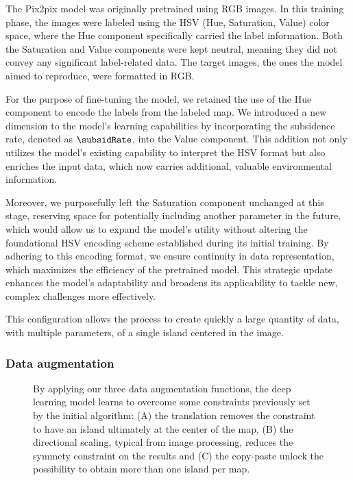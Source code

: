 The Pix2pix model was originally pretrained using RGB images. In this training phase, the images were labeled using the HSV (Hue, Saturation, Value) color space, where the Hue component specifically carried the label information. Both the Saturation and Value components were kept neutral, meaning they did not convey any significant label-related data. The target images, the ones the model aimed to reproduce, were formatted in RGB.

For the purpose of fine-tuning the model, we retained the use of the Hue component to encode the labels from the labeled map. We introduced a new dimension to the model's learning capabilities by incorporating the subsidence rate, denoted as $\subsidRate$, into the Value component. This addition not only utilizes the model's existing capability to interpret the HSV format but also enriches the input data, which now carries additional, valuable environmental information.

Moreover, we purposefully left the Saturation component unchanged at this stage, reserving space for potentially including another parameter in the future, which would allow us to expand the model's utility without altering the foundational HSV encoding scheme established during its initial training. By adhering to this encoding format, we ensure continuity in data representation, which maximizes the efficiency of the pretrained model. This strategic update enhances the model's adaptability and broadens its applicability to tackle new, complex challenges more effectively.

This configuration allows the process to create quickly a large quantity of data, with multiple parameters, of a single island centered in the image. 

\subsubsection{Data augmentation}
\begin{figure}
    \caption{By applying our three data augmentation functions, the deep learning model learns to overcome some constraints previously set by the initial algorithm: (A) the translation removes the constraint to have an island ultimately at the center of the map, (B) the directional scaling, typical from image processing, reduces the symmety constraint on the results and (C) the copy-paste unlock the possibility to obtain more than one island per map.}
    \label{fig:coral-island-data-augmentation-examples}
\end{figure}

